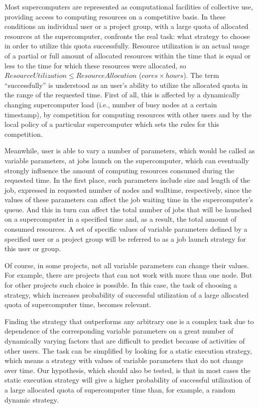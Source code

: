 Most supercomputers are represented as computational facilities of collective use, providing access to computing resources on a competitive basis. In these conditions an individual user or a project group, with a large quota of allocated resources at the supercomputer, confronts the real task: what strategy to choose in order to utilize this quota successfully. Resource utilization is an actual usage of a partial or full amount of allocated resources within the time that is equal or less to the time for which these resources were allocated, so $ResourceUtilization \leq ResourceAllocation$ ($cores \times hours$). The term ``successfully'' is understood as an user's ability to utilize the allocated quota in the range of the requested time. First of all, this is affected by a dynamically changing supercomputer load (i.e., number of busy nodes at a certain timestamp), by competition for computing resources with other users and by the local policy of a particular supercomputer which sets the rules for this competition. 

Meanwhile, user is able to vary a number of parameters, which would be called as variable parameters, at jobs launch on the supercomputer, which can eventually strongly influence the amount of computing resources consumed during the requested time. In the first place, such parameters include size and length of the job, expressed in requested number of nodes and walltime, respectively, since the values of these parameters can affect the job waiting time in the supercomputer's queue. And this in turn can affect the total number of jobs that will be launched on a supercomputer in a specified time and, as a result, the total amount of consumed resources. A set of specific values of variable parameters defined by a specified user or a project group will be referred to as a job launch strategy for this user or group.

Of course, in some projects, not all variable parameters can change their values. For example, there are projects that can not work with more than one node. But for other projects such choice is possible. In this case, the task of choosing a strategy, which increases probability of successful utilization of a large allocated quota of supercomputer time, becomes relevant.

Finding the strategy that outperforms any arbitrary one is a complex task due to dependence of the corresponding variable parameters on a great number of dynamically varying factors that are difficult to predict because of activities of other users. The task can be simplified by looking for a static execution strategy, which means a strategy with values of variable parameters that do not change over time. Our hypothesis, which should also be tested, is that in most cases the static execution strategy will give a higher probability of successful utilization of a large allocated quota of supercomputer time than, for example, a random dynamic strategy.

